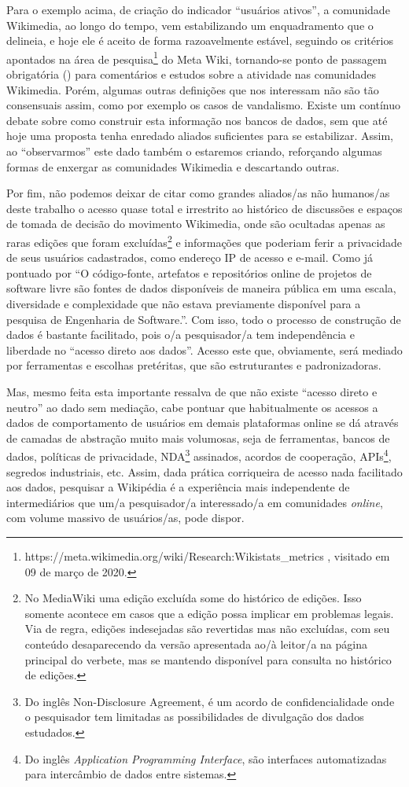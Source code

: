 Para o exemplo acima, de criação do indicador ``usuários ativos'', a comunidade Wikimedia, ao longo do tempo, vem estabilizando um enquadramento que o delineia, e hoje ele é aceito de forma razoavelmente estável, seguindo os critérios apontados na área de pesquisa\footnote{https://meta.wikimedia.org/wiki/Research:Wikistats\_metrics , visitado em 09 de março de 2020.} do Meta Wiki, tornando-se ponto de passagem obrigatória (\cite{latour_ciencia_1987}) para comentários e estudos sobre a atividade nas comunidades Wikimedia. Porém, algumas outras definições que nos interessam não são tão consensuais assim, como por exemplo os casos de vandalismo. Existe um contínuo debate sobre como construir esta informação nos bancos de dados, sem que até hoje uma proposta tenha enredado aliados suficientes para se estabilizar. Assim, ao ``observarmos'' este dado também o estaremos criando, reforçando algumas formas de enxergar as comunidades Wikimedia e descartando outras.

Por fim, não podemos deixar de citar como grandes aliados/as não humanos/as deste trabalho o acesso quase total e irrestrito ao histórico de discussões e espaços de tomada de decisão do movimento Wikimedia, onde são ocultadas apenas as raras edições que foram excluídas\footnote{No MediaWiki uma edição excluída some do histórico de edições. Isso somente acontece em casos que a edição possa implicar em problemas legais. Via de regra, edições indesejadas são revertidas mas não excluídas, com seu conteúdo desaparecendo da versão apresentada ao/à leitor/a na página principal do verbete, mas se mantendo disponível para consulta no histórico de edições.} e informações que poderiam ferir a privacidade de seus usuários cadastrados, como endereço IP de acesso e e-mail. Como já pontuado por \citep{scacchi_future_2010,p. 318} ``O código-fonte, artefatos e repositórios online de projetos de software livre são fontes de dados disponíveis de maneira pública em uma escala, diversidade e complexidade que não estava previamente disponível para a pesquisa de Engenharia de Software.''. Com isso, todo o processo de construção de dados é bastante facilitado, pois o/a pesquisador/a tem independência e liberdade no ``acesso direto aos dados''. Acesso este que, obviamente, será mediado por ferramentas e escolhas pretéritas, que são  estruturantes e padronizadoras.

Mas, mesmo feita esta importante ressalva de que não existe ``acesso direto e neutro'' ao dado sem mediação, cabe pontuar que habitualmente os acessos a dados de comportamento de usuários em demais plataformas online se dá através de camadas de abstração muito mais volumosas, seja de ferramentas, bancos de dados, políticas de privacidade, NDA\footnote{Do inglês Non-Disclosure Agreement, é um acordo de confidencialidade onde o pesquisador tem limitadas as possibilidades de divulgação dos dados estudados.} assinados, acordos de cooperação, APIs\footnote{Do inglês \textit{Application Programming Interface}, são interfaces automatizadas para intercâmbio de dados entre sistemas.}, segredos industriais, etc. Assim, dada prática corriqueira de acesso nada facilitado aos dados, pesquisar a Wikipédia é a experiência mais independente de intermediários que um/a pesquisador/a interessado/a em comunidades \textit{online}, com volume massivo de usuários/as, pode dispor.